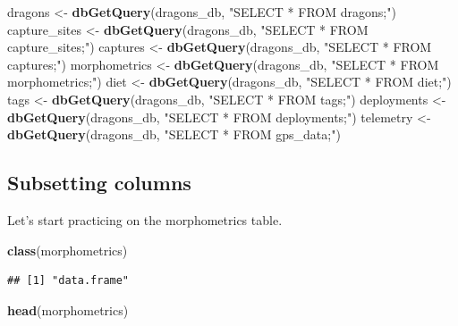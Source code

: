 \documentclass[
]{book}
\newenvironment{Shaded}{\begin{snugshade}}{\end{snugshade}}
\newcommand{\FunctionTok}[1]{\textcolor[rgb]{0.13,0.29,0.53}{\textbf{#1}}}
\newcommand{\NormalTok}[1]{#1}
\newcommand{\OtherTok}[1]{\textcolor[rgb]{0.56,0.35,0.01}{#1}}
\newcommand{\StringTok}[1]{\textcolor[rgb]{0.31,0.60,0.02}{#1}}
\begin{document}
\begin{Shaded}
\begin{Highlighting}[]
\NormalTok{dragons }\OtherTok{\textless{}{-}} \FunctionTok{dbGetQuery}\NormalTok{(dragons\_db, }\StringTok{"SELECT * FROM dragons;"}\NormalTok{)}
\NormalTok{capture\_sites }\OtherTok{\textless{}{-}} \FunctionTok{dbGetQuery}\NormalTok{(dragons\_db, }\StringTok{"SELECT * FROM capture\_sites;"}\NormalTok{)}
\NormalTok{captures }\OtherTok{\textless{}{-}} \FunctionTok{dbGetQuery}\NormalTok{(dragons\_db, }\StringTok{"SELECT * FROM captures;"}\NormalTok{)}
\NormalTok{morphometrics }\OtherTok{\textless{}{-}} \FunctionTok{dbGetQuery}\NormalTok{(dragons\_db, }\StringTok{"SELECT * FROM morphometrics;"}\NormalTok{)}
\NormalTok{diet }\OtherTok{\textless{}{-}} \FunctionTok{dbGetQuery}\NormalTok{(dragons\_db, }\StringTok{"SELECT * FROM diet;"}\NormalTok{)}
\NormalTok{tags }\OtherTok{\textless{}{-}} \FunctionTok{dbGetQuery}\NormalTok{(dragons\_db, }\StringTok{"SELECT * FROM tags;"}\NormalTok{)}
\NormalTok{deployments }\OtherTok{\textless{}{-}} \FunctionTok{dbGetQuery}\NormalTok{(dragons\_db, }\StringTok{"SELECT * FROM deployments;"}\NormalTok{)}
\NormalTok{telemetry }\OtherTok{\textless{}{-}} \FunctionTok{dbGetQuery}\NormalTok{(dragons\_db, }\StringTok{"SELECT * FROM gps\_data;"}\NormalTok{)}
\end{Highlighting}
\end{Shaded}

\hypertarget{subsetting-columns}{%
\subsection{Subsetting columns}\label{subsetting-columns}}

Let's start practicing on the morphometrics table.

\begin{Shaded}
\begin{Highlighting}[]
\FunctionTok{class}\NormalTok{(morphometrics)}
\end{Highlighting}
\end{Shaded}

\begin{verbatim}
## [1] "data.frame"
\end{verbatim}

\begin{Shaded}
\begin{Highlighting}[]
\FunctionTok{head}\NormalTok{(morphometrics)}
\end{Highlighting}
\end{Shaded}
\end{document}
